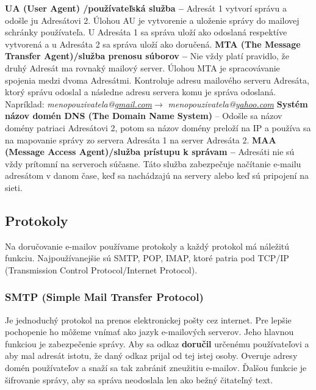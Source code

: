 \documentclass[10pt,slovak,twoside,a4paper]{article}
\begin{document}
\textbf{UA (User Agent) /používateľská služba –} Adresát 1 vytvorí správu a odošle ju Adresátovi 2. Úlohou AU je vytvorenie a uloženie správy do mailovej schránky používateľa. U Adresáta 1 sa správa uloží ako odoslaná respektíve vytvorená a u Adresáta 2 sa správa uloží ako doručená.\cite{GORALSKI}
\vspace{0.4cm}
\newline
\hfill
\textbf{MTA (The Message Transfer Agent)/služba prenosu súborov –} Nie vždy platí pravidlo, že druhý Adresát ma rovnaký mailový server. Úlohou MTA je spracovávanie spojenia medzi dvoma Adresátmi. Kontroluje adresu mailového serveru Adresáta, ktorý správu odoslal a následne adresu servera komu je správa odoslaná. Napríklad: \textit{menopouzivatela@\underline{gmail.com}}$\rightarrow$ \textit{menopouzivatela@\underline{yahoo.com}}
\vspace{0.4cm}
\newline
\hfill
\textbf{Systém názov domén DNS (The Domain Name System)}  – Odošle sa názov domény patriaci Adresátovi 2, potom sa názov domény preloží na IP a používa sa na mapovanie správy zo servera Adresáta 1 na server Adresáta 2.\cite{GORALSKI,active}
\vspace{0.4cm}
\newline
\hfill
\textbf{MAA (Message Access Agent)/služba prístupu k správam –} Adresáti nie sú vždy prítomní na serveroch súčasne. Táto služba zabezpečuje načítanie e-mailu adresátom v danom čase, keď sa nachádzajú na servery alebo keď sú pripojení na sieti.\cite{GORALSKI}

\subsection{Protokoly} 

Na doručovanie e-mailov používame protokoly a každý protokol má náležitú funkciu. Najpoužívanejšie sú SMTP, POP, IMAP, ktoré patria pod TCP/IP (Transmission Control Protocol/Internet Protocol).\cite{GORALSKI}

\subsubsection{SMTP (Simple Mail Transfer Protocol)}

Je jednoduchý protokol na prenos elektronickej pošty cez internet. Pre lepšie pochopenie ho môžeme vnímať ako jazyk e-mailových serverov. Jeho hlavnou funkciou je zabezpečenie správy. Aby sa odkaz \textbf{doručil} určenému používateľovi a aby mal adresát istotu, že daný odkaz prijal od tej istej osoby. Overuje adresy domén používateľov a snaží sa tak zabrániť zneužitiu e-mailov. Ďalšou funkcie je šifrovanie správy, aby sa správa neodoslala len ako bežný čitateľný text. 
\end{document}
